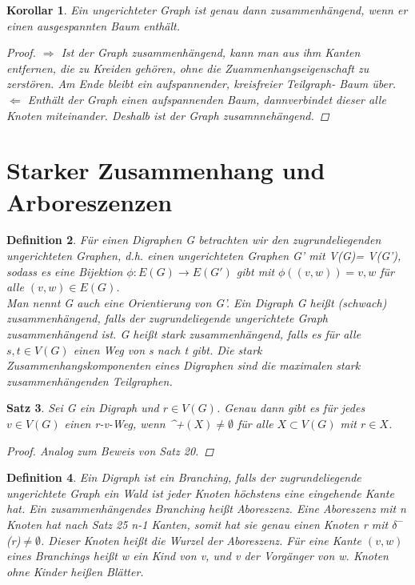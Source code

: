 \documentclass{article}
\newtheorem{satz}{Satz}
\newtheorem{korollar}[satz]{Korollar}
\newtheorem{definition}[satz]{Definition}
\begin{document}
 \begin{korollar} 
    Ein ungerichteter Graph ist genau dann zusammenhängend, wenn er einen ausgespannten Baum enthält.
   \begin {proof}
    $\Rightarrow$ Ist der Graph zusammenhängend, kann man aus ihm Kanten entfernen, die zu Kreiden gehören, ohne die Zuammenhangseigenschaft zu zerstören.
      Am Ende bleibt ein aufspannender, kreisfreier Teilgraph- Baum über.\\
    $\Leftarrow$ Enthält der Graph einen aufspannenden Baum, dannverbindet dieser alle Knoten miteinander. Deshalb ist der Graph zusamnnehängend.
    \end {proof}
 \end{korollar}
 \vspace{\baselineskip}
\newpage

\section{Starker Zusammenhang und Arboreszenzen}
  \begin{definition} 
    Für einen Digraphen G betrachten wir den zugrundeliegenden ungerichteten Graphen, d.h. einen ungerichteten Graphen G' mit V(G)= V(G'), sodass es eine Bijektion $\phi : E(G)\rightarrow E(G')$ gibt mit $\phi((v,w))= {v,w}$ für alle $(v,w)\in E(G)$.\\
    Man nennt G auch eine Orientierung von G'.
    Ein Digraph G heißt (schwach) zusammenhängend, falls der zugrundeliegende ungerichtete Graph zusammenhängend ist.
    G heißt stark zusammenhängend, falls es für alle $s,t \in V(G)$ einen Weg von s nach t gibt.
    Die stark Zusammenhangskomponenten eines Digraphen sind die maximalen stark zusammenhängenden Teilgraphen.
  \end{definition}
  \vspace{\baselineskip}

  \begin{satz} 
    Sei G ein Digraph und $r \in V(G)$.
    Genau dann gibt es für jedes $v\in V(G)$ einen r-v-Weg, wenn $ $\delta^+$(X) \neq \emptyset$ für alle $X\subset V(G)$ mit $r \in X$.
    \begin{proof}
      Analog zum Beweis von Satz 20.
    \end{proof} 
  \end{satz}
  \vspace{\baselineskip}

  \begin{definition} 
    Ein Digraph ist ein Branching, falls der zugrundeliegende ungerichtete Graph ein Wald ist jeder Knoten höchstens eine eingehende Kante hat.
    Ein zusammenhängendes Branching heißt Aboreszenz.
    Eine Aboreszenz mit n Knoten hat nach Satz 25 n-1 Kanten, somit hat sie genau einen Knoten r mit $\delta^-$(r)$\neq \emptyset$.
    Dieser Knoten heißt die Wurzel der Aboreszenz. 
    Für eine Kante $(v,w)$ eines Branchings heißt w ein Kind von v, und v der Vorgänger von w.
    Knoten ohne Kinder heißen Blätter.
  \end{definition}
  \vspace{\baselineskip}
\end{document}
